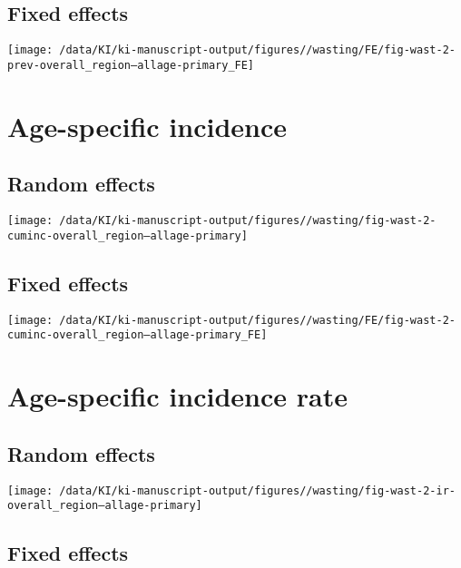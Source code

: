 \documentclass[
  9pt,
]{book}
\begin{document}
\hypertarget{fixed-effects-1}{%
\subsection{Fixed effects}\label{fixed-effects-1}}

\texttt{[image: /data/KI/ki-manuscript-output/figures//wasting/FE/fig-wast-2-prev-overall\_region--allage-primary\_FE]}

\hypertarget{age-specific-incidence}{%
\section{Age-specific incidence}\label{age-specific-incidence}}

\hypertarget{random-effects-1}{%
\subsection{Random effects}\label{random-effects-1}}

\texttt{[image: /data/KI/ki-manuscript-output/figures//wasting/fig-wast-2-cuminc-overall\_region--allage-primary]}

\hypertarget{fixed-effects-2}{%
\subsection{Fixed effects}\label{fixed-effects-2}}

\texttt{[image: /data/KI/ki-manuscript-output/figures//wasting/FE/fig-wast-2-cuminc-overall\_region--allage-primary\_FE]}

\hypertarget{age-specific-incidence-rate}{%
\section{Age-specific incidence rate}\label{age-specific-incidence-rate}}

\hypertarget{random-effects-2}{%
\subsection{Random effects}\label{random-effects-2}}

\texttt{[image: /data/KI/ki-manuscript-output/figures//wasting/fig-wast-2-ir-overall\_region--allage-primary]}

\hypertarget{fixed-effects-3}{%
\subsection{Fixed effects}\label{fixed-effects-3}}
\end{document}
